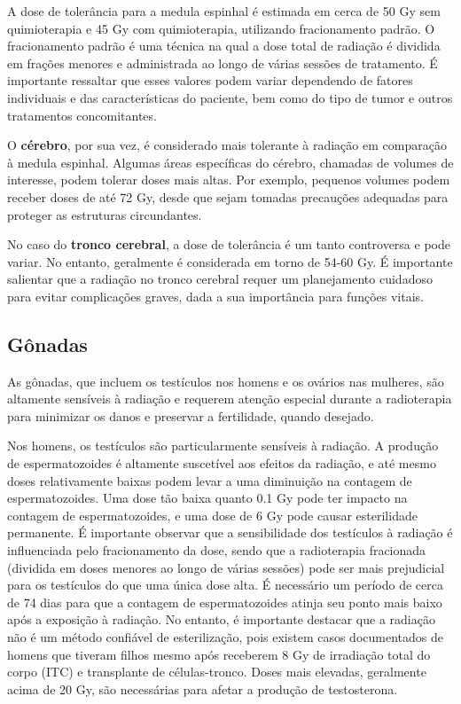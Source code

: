 \documentclass[11pt,a4paper]{article}
\newcounter{exemplo}
\begin{document}
	A dose de tolerância para a medula espinhal é estimada em cerca de 50 Gy sem quimioterapia e 45 Gy com quimioterapia, utilizando fracionamento padrão. O fracionamento padrão é uma técnica na qual a dose total de radiação é dividida em frações menores e administrada ao longo de várias sessões de tratamento. É importante ressaltar que esses valores podem variar dependendo de fatores individuais e das características do paciente, bem como do tipo de tumor e outros tratamentos concomitantes.

	O \textbf{cérebro}, por sua vez, é considerado mais tolerante à radiação em comparação à medula espinhal. Algumas áreas específicas do cérebro, chamadas de volumes de interesse, podem tolerar doses mais altas. Por exemplo, pequenos volumes podem receber doses de até 72 Gy, desde que sejam tomadas precauções adequadas para proteger as estruturas circundantes.

	No caso do \textbf{tronco cerebral}, a dose de tolerância é um tanto controversa e pode variar. No entanto, geralmente é considerada em torno de 54-60 Gy. É importante salientar que a radiação no tronco cerebral requer um planejamento cuidadoso para evitar complicações graves, dada a sua importância para funções vitais.

\subsection*{Gônadas}

	As gônadas, que incluem os testículos nos homens e os ovários nas mulheres, são altamente sensíveis à radiação e requerem atenção especial durante a radioterapia para minimizar os danos e preservar a fertilidade, quando desejado.

	Nos homens, os testículos são particularmente sensíveis à radiação. A produção de espermatozoides é altamente suscetível aos efeitos da radiação, e até mesmo doses relativamente baixas podem levar a uma diminuição na contagem de espermatozoides. Uma dose tão baixa quanto 0.1 Gy pode ter impacto na contagem de espermatozoides, e uma dose de 6 Gy pode causar esterilidade permanente. É importante observar que a sensibilidade dos testículos à radiação é influenciada pelo fracionamento da dose, sendo que a radioterapia fracionada (dividida em doses menores ao longo de várias sessões) pode ser mais prejudicial para os testículos do que uma única dose alta. É necessário um período de cerca de 74 dias para que a contagem de espermatozoides atinja seu ponto mais baixo após a exposição à radiação. No entanto, é importante destacar que a radiação não é um método confiável de esterilização, pois existem casos documentados de homens que tiveram filhos mesmo após receberem 8 Gy de irradiação total do corpo (ITC) e transplante de células-tronco. Doses mais elevadas, geralmente acima de 20 Gy, são necessárias para afetar a produção de testosterona.
\end{document}
